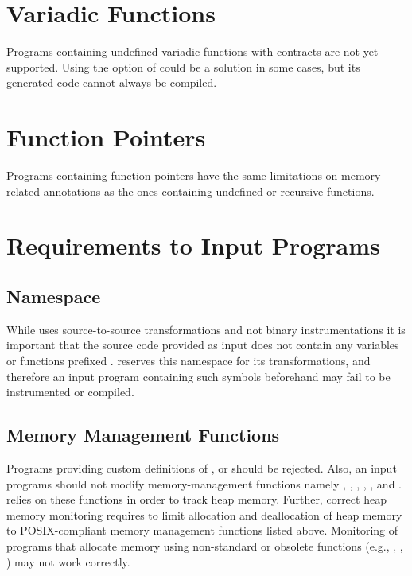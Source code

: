 
\section{Variadic Functions}

Programs containing undefined variadic functions with contracts are not yet
supported. Using the  option of \framac could
be a solution in some cases, but its generated code cannot always be compiled.

\section{Function Pointers}

Programs containing function pointers have the same limitations on
memory-related annotations as the ones containing undefined or recursive
functions.

\section{Requirements to Input Programs}

\subsection{\eacsl Namespace}
While \eacsl uses source-to-source transformations and not binary
instrumentations it is important that the source code provided as input does
not contain any variables or functions prefixed .  \eacsl
reserves this namespace for its transformations, and therefore an input program
containing such symbols beforehand may fail to be instrumented or compiled.

\subsection{Memory Management Functions}
Programs providing custom definitions of ,  or
 should be rejected. Also, an input programs should not modify
memory-management functions namely , , ,
, ,  and .  \eacsl relies
on these functions in order to track heap memory. Further, correct heap memory
monitoring requires to limit allocation and deallocation of heap memory to
POSIX-compliant memory management functions
listed above. Monitoring of programs that allocate memory using non-standard or
obsolete functions (e.g., , , ) may not work
correctly.
